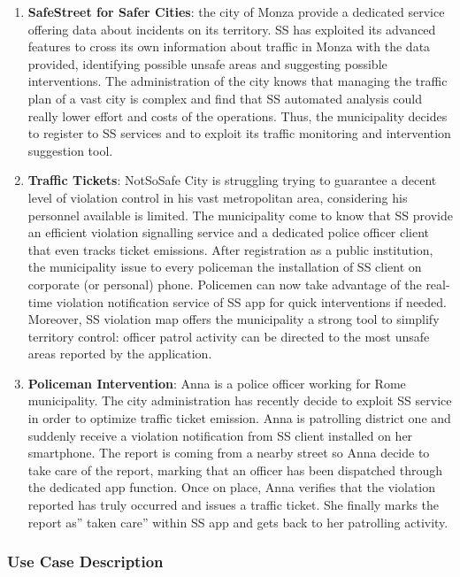 \begin{enumerate}
	\item \textbf{SafeStreet for Safer Cities}: the city of Monza provide a dedicated service offering data about incidents on its territory. SS has exploited its advanced features to cross its own information about traffic in Monza with the data provided, identifying possible unsafe areas and suggesting possible interventions. The administration of the city knows that managing the traffic plan of a vast city is complex and find that SS automated analysis could really lower effort and costs of the operations. Thus, the municipality decides to register to SS services and to exploit its traffic monitoring and intervention suggestion tool. 
	\item \textbf{Traffic Tickets}: NotSoSafe City is struggling trying to guarantee a decent level of violation control in his vast metropolitan area, considering his personnel available is limited. The municipality come to know that SS provide an efficient violation signalling service and a dedicated police officer client that even tracks ticket emissions. After registration as a public institution, the municipality issue to every policeman the installation of SS client on corporate (or personal) phone. Policemen can now take advantage of the real-time violation notification service of SS app for quick interventions if needed. Moreover, SS violation map offers the municipality a strong tool to simplify territory control: officer patrol activity can be directed to the most unsafe areas reported by the application.
	\item  \textbf{Policeman Intervention}: Anna is a police officer working for Rome municipality. The city administration has recently decide to exploit SS service in order to optimize traffic ticket emission. Anna is patrolling district one and suddenly receive a violation notification from SS client installed on her smartphone. The report is coming from a nearby street so Anna decide to take care of the report, marking that an officer has been dispatched  through the dedicated app function. Once on place, Anna verifies that the violation reported has truly occurred and issues a traffic ticket. She finally marks the report as” taken care” within SS app and gets back to her patrolling activity.
	\end{enumerate}
	
	
	\subsubsection{Use Case Description}
	\medskip
	
